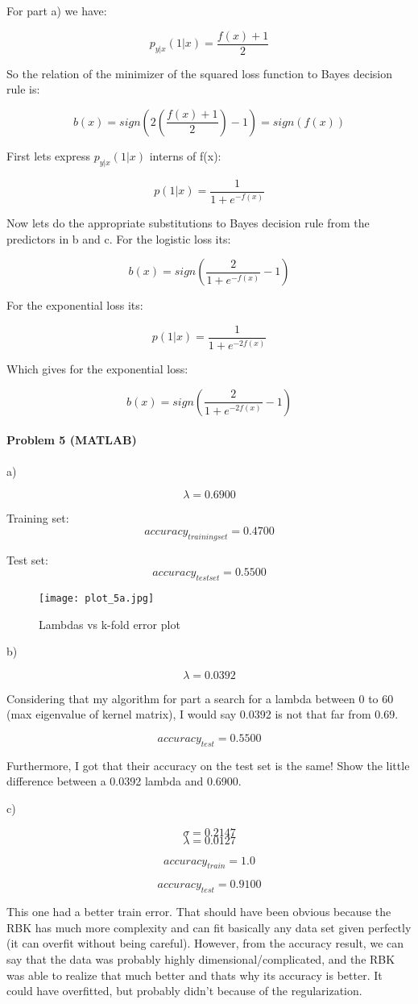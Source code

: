 \documentclass[12pt]{report}
\begin{document}
For part a) we have:

$$p_{y|x}(1|x) = \frac{f(x) + 1}{2}$$

So the relation of the minimizer of the squared loss function to Bayes decision rule is:

$$ \boxed{ b(x) = sign(2\left( \frac{f(x) + 1}{2} \right) -1 ) = sign(f(x))} $$

First lets express $p_{y|x}(1|x)$ interns of f(x):

$$p(1|x) = \frac{1}{1+e^{-f(x)} }$$

Now lets do the appropriate substitutions to Bayes decision rule from the predictors in b and c. For the logistic loss its:

$$ \boxed{b(x) = sign \left( \frac{2}{1+e^{-f(x)}}   - 1 \right)}$$

For the exponential loss its:

$$p(1|x) = \frac{1}{1+e^{-2f(x)} }$$

Which gives for the exponential loss:


$$ \boxed{ b(x) = sign \left( \frac{2}{1+e^{-2f(x)}}   - 1 \right) }$$

\paragraph{Problem 5 (MATLAB)}


a)


$$\lambda = 0.6900$$

Training set:
$$accuracy_{training  set} = 0.4700$$

Test set:
$$accuracy_{test  set} = 0.5500$$

\begin{figure}
\centering
\texttt{[image: plot\_5a.jpg]}
\caption{\label{fig:k-fold}Lambdas vs k-fold error plot}
\end{figure}

b)

$$\lambda =  0.0392$$

Considering that my algorithm for part a search for a lambda between 0 to 60 (max eigenvalue of kernel matrix), I would say 0.0392 is not that far from 0.69. 

$$ accuracy_{test}= 0.5500$$

Furthermore, I got that their accuracy on the test set is the same! Show the little difference between a 0.0392 lambda and 0.6900.

c)

$$ \sigma =  0.2147$$
$$ \lambda = 0.0127$$

$$ accuracy_{train} =  1.0$$

$$ accuracy_{test} =  0.9100$$

This one had a better train error. That should have been obvious because the RBK has much more complexity and can fit basically any data set given perfectly (it can overfit without being careful).
However, from the accuracy result, we can say that the data was probably highly dimensional/complicated, and the RBK was able to realize that much better and thats why its accuracy is better. It could have overfitted, but probably didn't because of the regularization.
\end{document}
